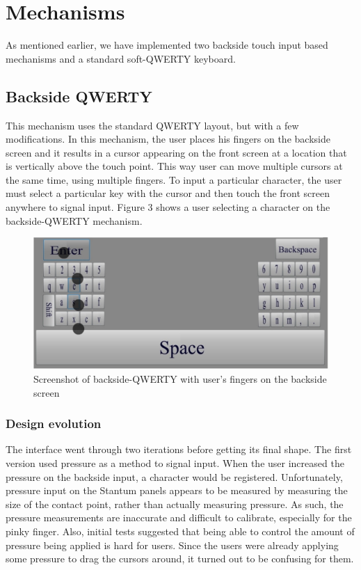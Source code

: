 \section{Mechanisms}

As mentioned earlier, we have implemented two backside touch input based mechanisms and a standard soft-QWERTY keyboard. 

\subsection{Backside QWERTY}
This mechanism uses the standard QWERTY layout, but with a few modifications. In this mechanism, the user places his fingers on the backside screen and it results in a cursor appearing on the front screen at a location that is vertically above the touch point. This way user can move multiple cursors at the same time, using multiple fingers. To input a particular character, the user must select a particular key with the cursor and then touch the front screen anywhere to signal input. Figure 3 shows a user selecting a character on the backside-QWERTY mechanism.

\begin{figure}
    \includegraphics[scale=0.45]{Figures/backside.pdf} 
    \caption{Screenshot of backside-QWERTY with user's fingers on the
      backside screen}
\end{figure}

\subsubsection{Design evolution}

The interface went through two iterations before getting its final shape. The first version used pressure as a method to signal input. When the user increased the pressure on the backside input, a character would be registered.  Unfortunately, pressure input on the Stantum panels appears to be measured by measuring the size of the contact point, rather than actually measuring pressure.  As such, the pressure measurements are inaccurate and difficult to calibrate, especially for the pinky finger. Also, initial tests suggested that being able to control the amount of pressure being applied is hard for users. Since the users were already applying some pressure to drag the cursors around, it turned out to be confusing for them.

